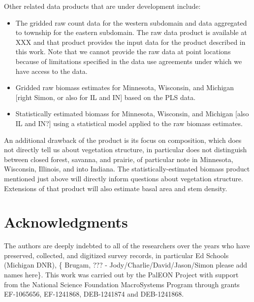 \documentclass[12pt]{article}\usepackage[]{graphicx}\usepackage[]{color}
\begin{document}
Other related data products that are under development include:
\begin{itemize}
\item The gridded raw count data for the western subdomain and data aggregated
to township for the eastern subdomain. The raw data product is available
at XXX and that product provides the input data for the product described
in this work. Note that we cannot provide the raw data at point locations
because of limitations specified in the data use agreements under
which we have access to the data.
\item Gridded raw biomass estimates for Minnesota, Wisconsin, and Michigan
{[}right Simon, or also for IL and IN{]} based on the PLS data.
\item Statistically estimated biomass for Minnesota, Wisconsin, and Michigan
{[}also IL and IN?{]} using a statistical model applied to the raw
biomass estimates.
\end{itemize}
An additional drawback of the product is its focus on composition,
which does not directly tell us about vegetation structure, in particular
does not distinguish between closed forest, savanna, and prairie,
of particular note in Minnesota, Wisconsin, Illinois, and into Indiana.
The statistically-estimated biomass product mentioned just above will
directly inform questions about vegetation structure. Extensions of
that product will also estimate basal area and stem density. 


\section*{Acknowledgments}

The authors are deeply indebted to all of the researchers over the
years who have preserved, collected, and digitized survey records,
in particular Ed Schools (Michigan DNR), \{ Brugam, ??? - Jody/Charlie/David/Jason/Simon
please add names here\}. This work was carried out by the PalEON Project
with support from the National Science Foundation MacroSystems Program
through grants EF-1065656, EF-1241868, DEB-1241874 and DEB-1241868. 




\end{document}
